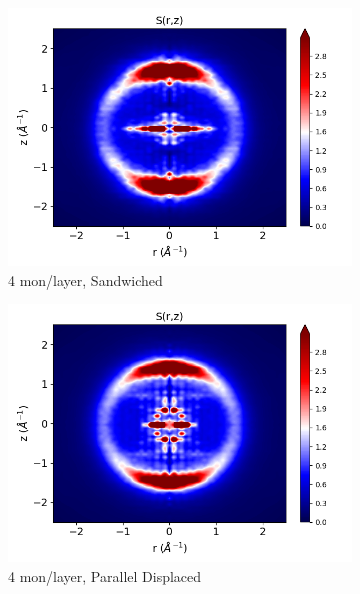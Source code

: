\documentclass{article}
\begin{document}
  \begin{figure}
	\centering
        \begin{subfigure}{0.40\textwidth}
                \centering
                \includegraphics[width=\textwidth]{rzplot_layered_4.png}
                \caption{4 mon/layer, Sandwiched}\label{fig:rzplot_layered_4}
        \end{subfigure}
        \begin{subfigure}{0.40\textwidth}
                \centering
                \includegraphics[width=\textwidth]{rzplot_offset_4.png}
                \caption{4 mon/layer, Parallel Displaced}\label{fig:rzplot_offset_4}
        \end{subfigure}
        \begin{subfigure}{0.40\textwidth}

\end{subfigure}
\end{figure}
\end{document}
